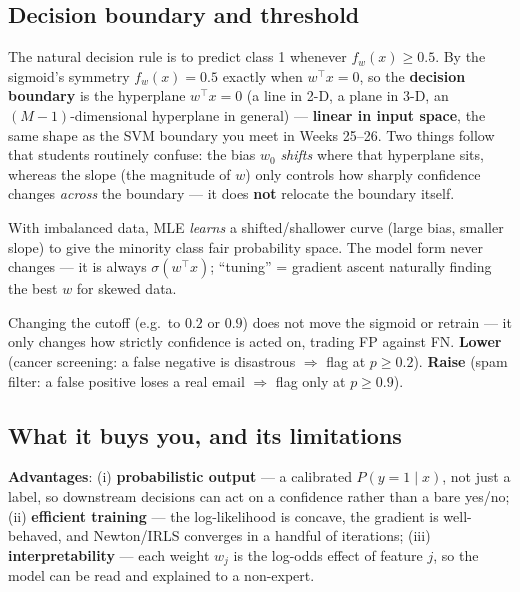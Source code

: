 \documentclass[11pt, a4paper]{article}
\newcommand{\kw}[1]{\textbf{#1}}
\begin{document}
\subsection{Decision boundary and threshold}

The natural decision rule is to predict class 1 whenever $f_w(x)\ge0.5$. By the sigmoid's symmetry
$f_w(x)=0.5$ exactly when $w^\top x=0$, so the \kw{decision boundary} is the hyperplane $w^\top x=0$
(a line in 2-D, a plane in 3-D, an $(M{-}1)$-dimensional hyperplane in general) — \kw{linear in input
space}, the same shape as the SVM boundary you meet in Weeks 25--26. Two things follow that students
routinely confuse: the bias $w_0$ \emph{shifts} where that hyperplane sits, whereas the slope (the
magnitude of $w$) only controls how sharply confidence changes \emph{across} the boundary — it does
\kw{not} relocate the boundary itself.

\begin{notebox}
With imbalanced data, MLE \emph{learns} a shifted/shallower curve (large bias, smaller slope) to give
the minority class fair probability space. The model form never changes — it is always
$\sigma(w^\top x)$; ``tuning'' = gradient ascent naturally finding the best $w$ for skewed data.
\end{notebox}

\begin{notebox}
Changing the cutoff (e.g.\ to $0.2$ or $0.9$) does not move the sigmoid or retrain — it only changes
how strictly confidence is acted on, trading FP against FN. \kw{Lower} (cancer screening: a false
negative is disastrous $\Rightarrow$ flag at $p\ge0.2$). \kw{Raise} (spam filter: a false positive
loses a real email $\Rightarrow$ flag only at $p\ge0.9$).
\end{notebox}

\subsection{What it buys you, and its limitations}

\kw{Advantages}: (i) \kw{probabilistic output} — a calibrated $P(y{=}1\mid x)$, not just a label, so
downstream decisions can act on a confidence rather than a bare yes/no; (ii) \kw{efficient training}
— the log-likelihood is concave, the gradient is well-behaved, and Newton/IRLS converges in a
handful of iterations; (iii) \kw{interpretability} — each weight $w_j$ is the log-odds effect of
feature $j$, so the model can be read and explained to a non-expert.
\end{document}
